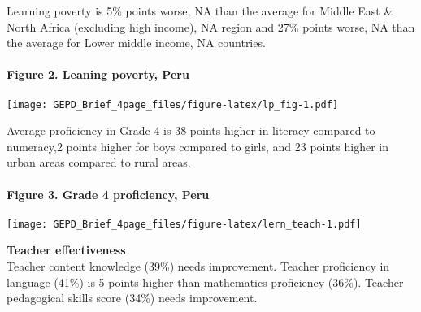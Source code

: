 \documentclass[twocolumn]{article}
\let\oldparagraph\paragraph
\renewcommand{\paragraph}[1]{\oldparagraph{#1}\mbox{}}
\begin{document}
Learning poverty is 5\% points worse, NA than the average for Middle
East \& North Africa (excluding high income), NA region and 27\% points
worse, NA than the average for Lower middle income, NA countries.

\hypertarget{figure-2.-leaning-poverty-peru}{%
\paragraph{Figure 2. Leaning poverty,
Peru}\label{figure-2.-leaning-poverty-peru}}

\texttt{[image: GEPD\_Brief\_4page\_files/figure-latex/lp\_fig-1.pdf]}

Average proficiency in Grade 4 is 38 points higher in literacy compared
to numeracy,2 points higher for boys compared to girls, and 23 points
higher in urban areas compared to rural areas.

\hypertarget{figure-3.-grade-4-proficiency-peru}{%
\paragraph{Figure 3. Grade 4 proficiency,
Peru}\label{figure-3.-grade-4-proficiency-peru}}

\texttt{[image: GEPD\_Brief\_4page\_files/figure-latex/lern\_teach-1.pdf]}

\textbf{Teacher effectiveness}\\
Teacher content knowledge (39\%) needs improvement. Teacher proficiency
in language (41\%) is 5 points higher than mathematics proficiency
(36\%). Teacher pedagogical skills score (34\%) needs improvement.
\end{document}
